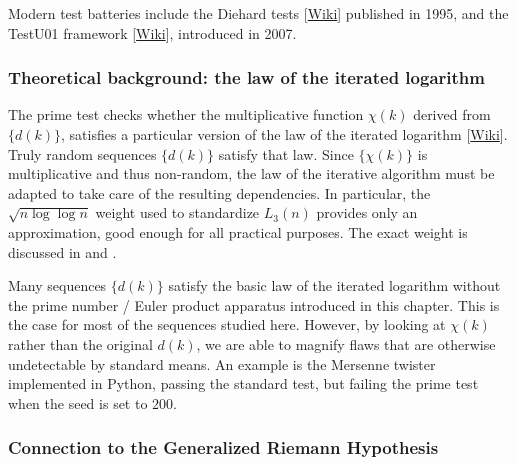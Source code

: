 \documentclass[oneside,10pt]{book}
\begin{document}
Modern test batteries
 include the \textcolor{index}{Diehard tests} [\href{https://en.wikipedia.org/wiki/Diehard_tests}{Wiki}] published in 1995, and the
 \textcolor{index}{TestU01} framework [\href{https://en.wikipedia.org/wiki/TestU01}{Wiki}], introduced in 2007. 



\subsubsection{Theoretical background: the law of the iterated logarithm}\label{iterlawsd}

The prime test checks whether the multiplicative function $\chi(k)$ derived from $\{d(k)\}$, satisfies a particular version of the 
 \textcolor{index}{law of the iterated logarithm} [\href{https://en.wikipedia.org/wiki/Law_of_the_iterated_logarithm}{Wiki}]. Truly random sequences $\{d(k)\}$ satisfy that law. Since $\{\chi(k)\}$ is multiplicative and thus non-random, the law of the iterative algorithm
 must be adapted to take care of the resulting dependencies. In particular, the $\sqrt{n\log\log n}$ weight used to standardize
  $L_3(n)$  provides only an approximation, good enough for all practical purposes. The exact weight is discussed in 
  \cite{harper2020} and \cite{yukkam2013}.  

Many sequences $\{d(k)\}$ satisfy the basic law of the iterated logarithm without the prime number / Euler product apparatus introduced 
 in this chapter. This is the case for most of the sequences studied here. However, by looking at $\chi(k)$ rather than the original 
 $d(k)$, we are able to magnify flaws that are otherwise undetectable by standard means. An example is the Mersenne twister
  implemented in Python, passing the standard test, but failing the prime test when the seed is set to $200$. 

\subsubsection{Connection to the Generalized Riemann Hypothesis}\label{iurhty}
\end{document}
